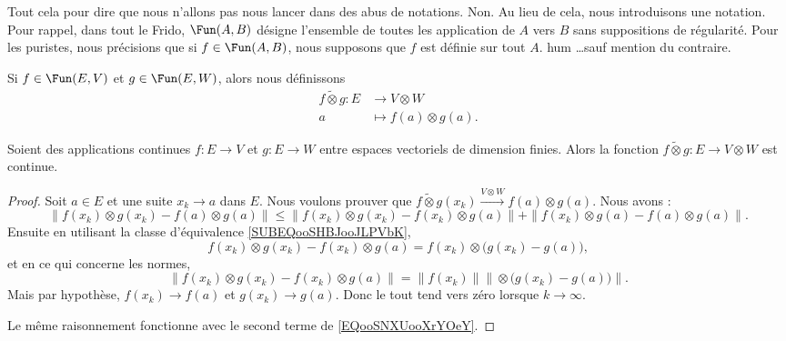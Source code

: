 Tout cela pour dire que nous n'allons pas nous lancer dans des abus de notations. Non. Au lieu de cela, nous introduisons une notation. Pour rappel, dans tout le Frido, \( \Fun(A,B)\) désigne l'ensemble de toutes les application de \( A\) vers \( B\) sans suppositions de régularité. Pour les puristes, nous précisions que si \( f\in\Fun(A,B)\), nous supposons que \( f\) est définie sur tout \( A\). hum \ldots sauf mention du contraire.
\begin{definition}      \label{DEFooMVNDooFWFtRn}
    Si \( f\in \Fun(E,V)\) et \( g\in \Fun(E,W)\), alors nous définissons
    \begin{equation}
        \begin{aligned}
            f\tilde\otimes g\colon E&\to V\otimes W \\
            a&\mapsto f(a)\otimes g(a). 
        \end{aligned}
    \end{equation}
\end{definition}

\begin{proposition}     \label{PROPooCRVXooEGxdZl}
    Soient des applications continues \( f\colon E\to V\) et \( g\colon E\to W\) entre espaces vectoriels de dimension finies. Alors la fonction \( f\tilde\otimes g\colon E\to V\otimes W\) est continue.
\end{proposition}

\begin{proof}
    Soit \( a\in E\) et une suite \( x_k\to a\) dans \( E\). Nous voulons prouver que \( f\tilde\otimes g(x_k)\stackrel{V\otimes W}{\longrightarrow}f(a)\otimes g(a)\). Nous avons :
    \begin{equation}        \label{EQooSNXUooXrYOeY}
        \| f(x_k)\otimes g(x_k)-f(a)\otimes g(a) \|\leq \| f(x_k)\otimes g(x_k)-f(x_k)\otimes g(a) \|+\| f(x_k)\otimes g(a)-f(a)\otimes g(a) \|.
    \end{equation}
    Ensuite en utilisant la classe d'équivalence \eqref{SUBEQooSHBJooJLPVbK}, 
    \begin{equation}
        f(x_k)\otimes g(x_k)-f(x_k)\otimes g(a)=f(x_k)\otimes \big( g(x_k)-g(a) \big),
    \end{equation}
    et en ce qui concerne les normes,
    \begin{equation}
    \|   f(x_k)\otimes g(x_k)-f(x_k)\otimes g(a)\|  =\|f(x_k)\|  \|\otimes \big( g(x_k)-g(a) \big)\|.
    \end{equation}
    Mais par hypothèse, \( f(x_k)\to f(a)\) et \( g(x_k)\to g(a)\). Donc le tout tend vers zéro lorsque \( k\to \infty\).

    Le même raisonnement fonctionne avec le second terme de \eqref{EQooSNXUooXrYOeY}.
\end{proof}

